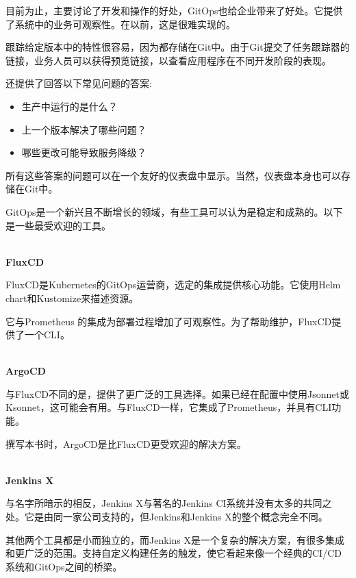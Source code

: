 目前为止，主要讨论了开发和操作的好处，GitOps也给企业带来了好处。它提供了系统中的业务可观察性。在以前，这是很难实现的。

跟踪给定版本中的特性很容易，因为都存储在Git中。由于Git提交了任务跟踪器的链接，业务人员可以获得预览链接，以查看应用程序在不同开发阶段的表现。

还提供了回答以下常见问题的答案:

\begin{itemize}
\item 
生产中运行的是什么？

\item 
上一个版本解决了哪些问题？

\item 
哪些更改可能导致服务降级？
\end{itemize}

所有这些答案的问题可以在一个友好的仪表盘中显示。当然，仪表盘本身也可以存储在Git中。


GitOps是一个新兴且不断增长的领域，有些工具可以认为是稳定和成熟的。以下是一些最受欢迎的工具。

\hspace*{\fill} \\ %
\noindent
\textbf{FluxCD}

FluxCD是Kubernetes的GitOps运营商，选定的集成提供核心功能。它使用Helm chart和Kustomize来描述资源。

它与Prometheus 的集成为部署过程增加了可观察性。为了帮助维护，FluxCD提供了一个CLI。

\hspace*{\fill} \\ %
\noindent
\textbf{ArgoCD}

与FluxCD不同的是，提供了更广泛的工具选择。如果已经在配置中使用Jsonnet或Ksonnet，这可能会有用。与FluxCD一样，它集成了Prometheus，并具有CLI功能。

撰写本书时，ArgoCD是比FluxCD更受欢迎的解决方案。

\hspace*{\fill} \\ %
\noindent
\textbf{Jenkins X}

与名字所暗示的相反，Jenkins X与著名的Jenkins CI系统并没有太多的共同之处。它是由同一家公司支持的，但Jenkins和Jenkins X的整个概念完全不同。

其他两个工具都是小而独立的，而Jenkins X是一个复杂的解决方案，有很多集成和更广泛的范围。支持自定义构建任务的触发，使它看起来像一个经典的CI/CD系统和GitOps之间的桥梁。








